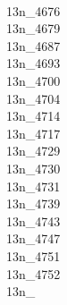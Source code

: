 \\13n\_4676\\13n\_4679\\13n\_4687\\13n\_4693\\13n\_4700\\13n\_4704\\13n\_4714\\13n\_4717\\13n\_4729\\13n\_4730\\13n\_4731\\13n\_4739\\13n\_4743\\13n\_4747\\13n\_4751\\13n\_4752\\13n\_